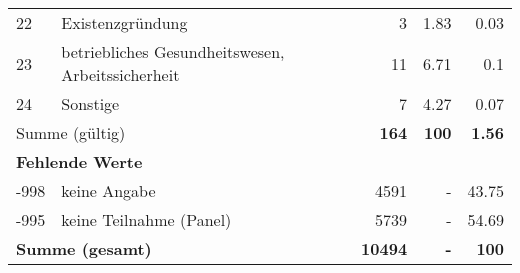 \begin{longtable}{lXrrr}
        22 & \multicolumn{1}{X}{Existenzgründung} & %
          \num{3} &
          \num[round-mode=places,round-precision=2]{1.83} &
          \num[round-mode=places,round-precision=2]{0.03} \\

        23 & \multicolumn{1}{X}{betriebliches Gesundheitswesen, Arbeitssicherheit} & %
          \num{11} &
          \num[round-mode=places,round-precision=2]{6.71} &
          \num[round-mode=places,round-precision=2]{0.1} \\

        24 & \multicolumn{1}{X}{Sonstige} & %
          \num{7} &
          \num[round-mode=places,round-precision=2]{4.27} &
          \num[round-mode=places,round-precision=2]{0.07} \\

     \midrule
     \multicolumn{2}{l}{Summe (gültig)} &
       \textbf{\num{164}} &
     \textbf{\num{100}} &
       \textbf{\num[round-mode=places,round-precision=2]{1.56}} \\
     \multicolumn{5}{l}{\textbf{Fehlende Werte}}\\
       -998 &
       keine Angabe &
         \num{4591} &
        - &
         \num[round-mode=places,round-precision=2]{43.75} \\
       -995 &
       keine Teilnahme (Panel) &
         \num{5739} &
        - &
         \num[round-mode=places,round-precision=2]{54.69} \\
     \midrule
     \multicolumn{2}{l}{\textbf{Summe (gesamt)}} &
          \textbf{\num{10494}} &
        \textbf{-} &
        \textbf{\num{100}} \\
     \bottomrule
     \end{longtable}
     
